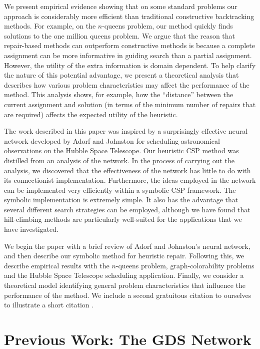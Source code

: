 \documentclass[twoside,12pt,titlepage,a4paper]{article}
\begin{document}
We present empirical evidence showing that on some standard problems
our approach is considerably more efficient than traditional constructive
backtracking methods. For example, on the $n$-queens problem, our
method quickly finds solutions to the one million queens 
problem.
We argue that the reason that repair-based methods can outperform
constructive methods is because a complete assignment can be more
informative in guiding search than a partial assignment.
However, the utility of
the extra information is domain dependent. To help clarify the nature of
this potential advantage, we present a theoretical analysis that
describes how various problem characteristics may affect the
performance of the method. This analysis shows, for example, how the
``distance'' between the current assignment and solution (in terms of
the minimum number of repairs that are required) affects the expected
utility of the heuristic.

The work described in this paper was inspired by a surprisingly
effective neural network developed by Adorf and 
Johnston \cite{adorf,johnston}
 for scheduling astronomical observations on the
Hubble Space Telescope.  Our heuristic CSP method
was distilled from
an analysis of the network.
In the process of carrying out the
analysis, we discovered that the effectiveness of the network has
little to do with its connectionist implementation. Furthermore, the
ideas employed in the network can be implemented very efficiently
within a symbolic CSP framework. The symbolic implementation is
extremely simple. It also has the advantage that several different
search strategies can be employed, although we have found that
hill-climbing methods are particularly well-suited for the
applications that we have investigated.

We begin the paper with a brief review of Adorf and Johnston's neural
network, and then describe our symbolic method for heuristic repair.
Following this, we describe empirical results with the
$n$-queens problem, graph-colorability problems and the
Hubble Space Telescope scheduling application. Finally,
we consider a theoretical model identifying
general problem characteristics that 
influence the performance of the method. We include a second gratuitous
citation to ourselves to illustrate a short citation \cite{min-aaai}.

\section{Previous Work: The GDS Network}
\label{network}
\end{document}
